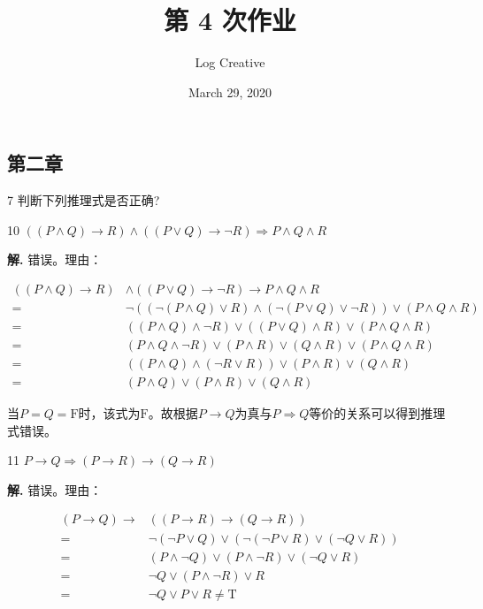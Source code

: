 \documentclass[12pt]{article}
\title{第 4 次作业}
\author{Log Creative}
\date{March 29, 2020}
\newenvironment{firstlayer}%
{\begin{list}{}{\renewcommand{\makelabel}[1]{\textbf{##1}.\hfil}
}}
{\end{list}}
\newenvironment{secondlayer}%
{\begin{list}{}{\renewcommand{\makelabel}[1]{(##1)\hfil}
}}
{\end{list}}
\begin{document}
\begin{CJK}{UTF8}{gbsn}

\maketitle

\section*{第二章}

\begin{firstlayer}
  \item[7] 判断下列推理式是否正确?
  \begin{secondlayer}
    \item[10] \(((P\wedge Q)\rightarrow R)\wedge ( ( P\vee Q)\rightarrow \neg R)\Rightarrow P\wedge Q\wedge R\)

    \textbf{解.} 错误。理由：

\begin{align*}
  ((P\wedge Q)\rightarrow R)&\wedge (( P\vee Q)\rightarrow \neg R)\rightarrow P\wedge Q\wedge R \\
  =&\neg ((\neg (P\wedge Q)\vee R)\wedge (\neg ( P\vee Q)\vee \neg R))\vee (P\wedge Q\wedge R) \\
  =&((P\wedge Q)\wedge \neg R)\vee((P\vee Q)\wedge R)\vee(P\wedge Q\wedge R) \\
  =&(P\wedge Q\wedge \neg R)\vee(P\wedge R)\vee(Q\wedge R)\vee(P\wedge Q\wedge R) \\
  =&((P\wedge Q)\wedge(\neg R\vee R))\vee(P\wedge R)\vee(Q\wedge R) \\
  =&(P\wedge Q)\vee (P\wedge R)\vee(Q\wedge R)
\end{align*}

当\(P=Q=\text{F}\)时，该式为\(\text{F}\)。故根据\(P\rightarrow Q\)为真与\(P\Rightarrow Q\)等价的关系可以得到推理式错误。

    \item[11] \(P \rightarrow Q \Rightarrow ( P \rightarrow R) \rightarrow (Q \rightarrow R)\)

    \textbf{解.} 错误。理由：

\begin{align*}
  (P \rightarrow Q) \rightarrow & (( P \rightarrow R) \rightarrow (Q \rightarrow R)) \\
  =&\neg (\neg P\vee Q)\vee(\neg(\neg P\vee R)\vee (\neg Q\vee R))\\
  =&(P\wedge \neg Q)\vee(P\wedge \neg R)\vee(\neg Q\vee R)\\
  =&\neg Q\vee (P\wedge \neg R)\vee R \\
  =&\neg Q\vee P\vee R\neq \text{T}
\end{align*}


\end{secondlayer}
\end{firstlayer}
\end{CJK}
\end{document}
